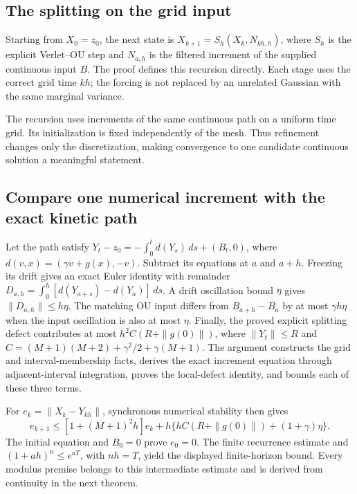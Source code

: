\documentclass[11pt,a4paper]{report}
\begin{document}
\subsection{\texorpdfstring{The splitting on the grid input}{The splitting on the grid input}}
\label{report-step-KineticLangevin-KineticSplittingConvergence-lean-1}


Starting from \(X_0=z_0\), the next state is \(X_{k+1}=S_h(X_k,N_{kh,h})\), where \(S_h\) is the explicit Verlet–OU step and \(N_{a,h}\) is the filtered increment of the supplied continuous input \(B\). The proof defines this recursion directly. Each stage uses the correct grid time \(kh\); the forcing is not replaced by an unrelated Gaussian with the same marginal variance.



The recursion uses increments of the same continuous path on a uniform time grid. Its initialization is fixed independently of the mesh. Thus refinement changes only the discretization, making convergence to one candidate continuous solution a meaningful statement.

\subsection{\texorpdfstring{Compare one numerical increment with the exact kinetic path}{Compare one numerical increment with the exact kinetic path}}
\label{report-step-KineticLangevin-KineticSplittingConvergence-lean-2}


Let the path satisfy \(Y_t-z_0=-\int_0^t d(Y_s)\,ds+(B_t,0)\), where \(d(v,x)=(\gamma v+g(x),-v)\). Subtract its equations at \(a\) and \(a+h\). Freezing its drift gives an exact Euler identity with remainder \(D_{a,h}=\int_0^h[d(Y_{a+s})-d(Y_a)]\,ds\). A drift oscillation bound \(\eta\) gives \(\|D_{a,h}\|\le h\eta\). The matching OU input differs from \(B_{a+h}-B_a\) by at most \(\gamma h\eta\) when the input oscillation is also at most \(\eta\). Finally, the proved explicit splitting defect contributes at most \(h^2C(R+\|g(0)\|)\), where \(\|Y_t\|\le R\) and \(C=(M+1)(M+2)+\gamma^2/2+\gamma(M+1)\). The argument constructs the grid and interval-membership facts, derives the exact increment equation through adjacent-interval integration, proves the local-defect identity, and bounds each of these three terms.



For \(e_k=\|X_k-Y_{kh}\|\), synchronous numerical stability then gives \[e_{k+1}\le[1+(M+1)^2h]e_k+h\{hC(R+\|g(0)\|)+(1+\gamma)\eta\}.\] The initial equation and \(B_0=0\) prove \(e_0=0\). The finite recurrence estimate and \((1+ah)^n\le e^{aT}\), with \(nh=T\), yield the displayed finite-horizon bound. Every modulus premise belongs to this intermediate estimate and is derived from continuity in the next theorem.
\end{document}
